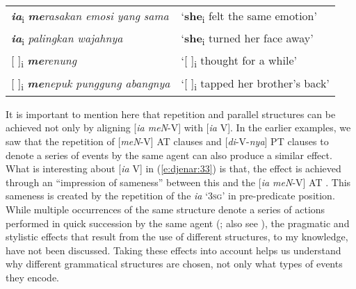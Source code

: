 \documentclass[output=paper
,modfonts
,nonflat]{langsci/langscibook}
\begin{document}
\begin{exe}
	\ex\label{e:djenar:35}
		\begin{tabular}[t]{ll}
			\textbf{\textit{ia}}\textsubscript{i} \textbf{\textit{me}}\textit{rasakan emosi yang sama}  & ‘\textbf{she}\textsubscript{i} felt the same emotion’\\
			\textbf{\textit{ia}}\textsubscript{i} \textit{palingkan wajahnya} & ‘\textbf{she}\textsubscript{i} turned her face away’\\
			{[ ]}\textsubscript{i} \textbf{\textit{me}}\textit{renung} & ‘{[ ]}\textsubscript{i} thought for a while’\\
			{[ ]}\textsubscript{i} \textbf{\textit{me}}\textit{nepuk punggung abangnya} & ‘{[ ]}\textsubscript{i} tapped her brother’s back’
		\end{tabular}
\end{exe}

\noindent
It is important to mention here that repetition and parallel structures can be achieved not only by aligning [\textit{ia meN}-V] with [\textit{ia} V]. In the earlier examples, we saw that the repetition of [\textit{meN}-V] AT clauses and [\textit{di}-V-\textit{nya}] PT clauses to denote a series of events by the same agent can also produce a similar effect. What is interesting about [\textit{ia} V]  in (\ref{e:djenar:33}) is that, the effect is achieved through an “impression of sameness” between this   and the [\textit{ia meN}-V] AT . This sameness is created by the repetition of the  \textit{ia} ‘\textsc{3sg}’ in pre-predicate position. While multiple occurrences of the same  structure denote a series of actions performed in quick succession by the same agent (\citealt[174]{Cumming1991}; also see \citealt[225]{Kaswanti1988}), the pragmatic and stylistic effects that result from the use of different  structures, to my knowledge, have not been discussed. Taking these effects into account helps us understand why different grammatical structures are chosen, not only what types of events they encode. 
\end{document}

